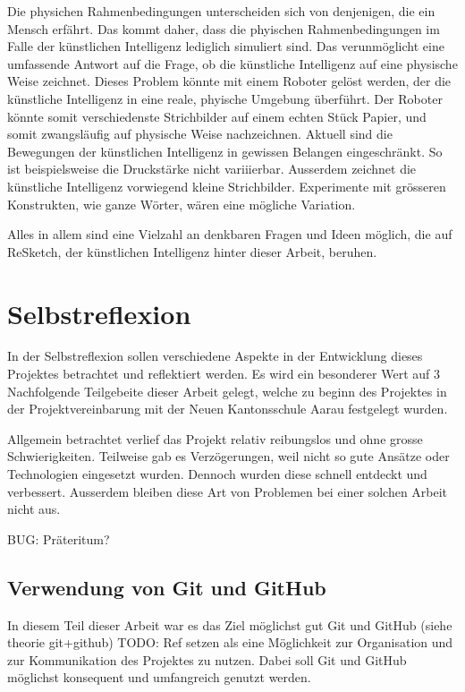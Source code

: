 Die physichen Rahmenbedingungen unterscheiden sich von denjenigen, die ein
Mensch erfährt. Das kommt daher, dass die phyischen Rahmenbedingungen im Falle
der künstlichen Intelligenz lediglich simuliert sind. Das verunmöglicht eine
umfassende Antwort auf die Frage, ob die künstliche Intelligenz auf eine
physische Weise zeichnet. Dieses Problem könnte mit einem Roboter gelöst werden,
der die künstliche Intelligenz in eine reale, phyische Umgebung überführt. Der
Roboter könnte somit verschiedenste Strichbilder auf einem echten Stück Papier,
und somit zwangsläufig auf physische Weise nachzeichnen. 
Aktuell sind die Bewegungen der künstlichen Intelligenz in gewissen Belangen
eingeschränkt. So ist beispielsweise die Druckstärke nicht variiierbar. Ausserdem
zeichnet die künstliche Intelligenz vorwiegend kleine Strichbilder. Experimente
mit grösseren Konstrukten, wie ganze Wörter, wären eine mögliche Variation.

Alles in allem sind eine Vielzahl an denkbaren Fragen und Ideen möglich, die auf
ReSketch, der künstlichen Intelligenz hinter dieser Arbeit, beruhen.






\section{Selbstreflexion}
In der Selbstreflexion sollen verschiedene Aspekte in der Entwicklung dieses
Projektes betrachtet und reflektiert werden. Es wird ein besonderer Wert auf 3
Nachfolgende Teilgebeite dieser Arbeit gelegt, welche zu beginn des Projektes in
der Projektvereinbarung mit der Neuen Kantonsschule Aarau festgelegt wurden.

Allgemein betrachtet verlief das Projekt relativ reibungslos und ohne grosse
Schwierigkeiten. Teilweise gab es Verzögerungen, weil nicht so gute Ansätze oder
Technologien eingesetzt wurden. Dennoch wurden diese schnell entdeckt und
verbessert. Ausserdem bleiben diese Art von Problemen bei einer solchen Arbeit
nicht aus.

BUG: Präteritum?

\subsection*{Verwendung von Git und GitHub}
In diesem Teil dieser Arbeit war es das Ziel möglichst gut Git und GitHub (siehe
theorie git+github)  TODO: Ref setzen
als eine Möglichkeit zur Organisation und zur Kommunikation des Projektes zu
nutzen. Dabei soll Git und GitHub möglichst konsequent und umfangreich genutzt
werden.

